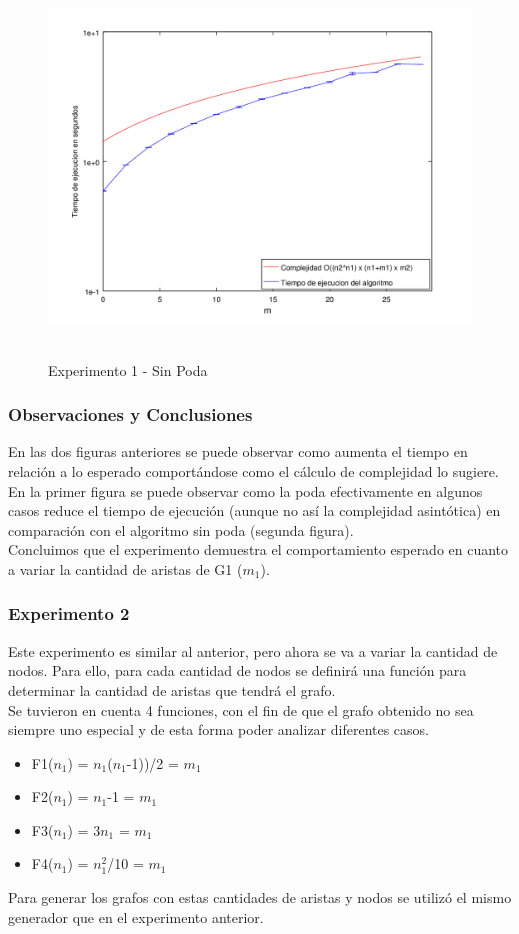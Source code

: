     \begin{figure}[H]
      \includegraphics[height=10cm]{graficos/ejercicio2-exp1bis.png}
       \caption{Experimento 1 - Sin Poda}
	\end{figure}
\subsubsection*{Observaciones y Conclusiones}\;
En las dos figuras anteriores se puede observar como aumenta el tiempo en relación a lo esperado comportándose como el cálculo de complejidad lo sugiere. En la primer figura se puede observar como la poda efectivamente en algunos casos reduce el tiempo de ejecución (aunque no así la complejidad asintótica) en comparación con el algoritmo sin poda (segunda figura).\\
Concluimos que el experimento demuestra el comportamiento esperado en cuanto a variar la cantidad de aristas de G1 ($m_1$).\\

        
\subsubsection*{Experimento 2}\;
\noindent Este experimento es similar al anterior, pero ahora se va a variar la cantidad de nodos. Para ello, para cada cantidad de nodos se definirá una función para determinar la cantidad de aristas que tendrá el grafo. \\
\noindent Se tuvieron en cuenta 4 funciones, con el fin de que el grafo obtenido no sea siempre uno especial y de esta forma poder analizar diferentes casos.
        \begin{itemize}
        \item F1($n_1$) = $n_1$($n_1$-1))/2 = $m_1$ 
        \item F2($n_1$) = $n_1$-1 = $m_1$ 
        \item F3($n_1$) = 3$n_1$ = $m_1$ 
        \item F4($n_1$) = $n_1^{2}$/10 = $m_1$ 
		\end{itemize} 
Para generar los grafos con estas cantidades de aristas y nodos se utilizó el mismo generador que en el experimento anterior.

